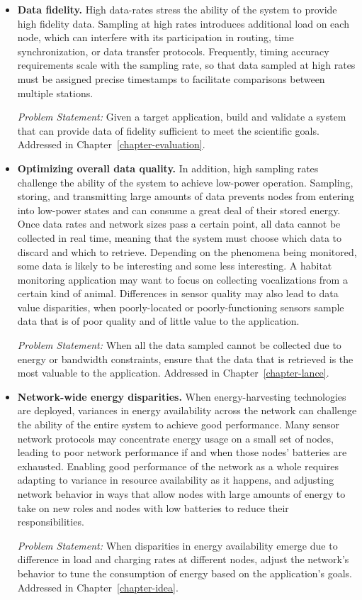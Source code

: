 \begin{itemize}

\item \textbf{Data fidelity.} High data-rates stress the ability of the
system to provide high fidelity data. Sampling at high rates introduces
additional load on each node, which can interfere with its participation in
routing, time synchronization, or data transfer protocols. Frequently, timing
accuracy requirements scale with the sampling rate, so that data sampled at
high rates must be assigned precise timestamps to facilitate comparisons
between multiple stations.

\textit{Problem Statement:} Given a target application, build and validate a
system that can provide data of fidelity sufficient to meet the scientific
goals. Addressed in Chapter~\ref{chapter-evaluation}.

\item \textbf{Optimizing overall data quality.} In addition, high sampling
rates challenge the ability of the system to achieve low-power operation.
Sampling, storing, and transmitting large amounts of data prevents nodes from
entering into low-power states and can consume a great deal of their stored
energy. Once data rates and network sizes pass a certain point, all data
cannot be collected in real time, meaning that the system must choose which
data to discard and which to retrieve. Depending on the phenomena being
monitored, some data is likely to be interesting and some less interesting. A
habitat monitoring application may want to focus on collecting vocalizations
from a certain kind of animal. Differences in sensor quality may also lead to
data value disparities, when poorly-located or poorly-functioning sensors
sample data that is of poor quality and of little value to the application.

\textit{Problem Statement:} When all the data sampled cannot be collected due
to energy or bandwidth constraints, ensure that the data that is retrieved is
the most valuable to the application. Addressed in
Chapter~\ref{chapter-lance}.

\item \textbf{Network-wide energy disparities.} When energy-harvesting
technologies are deployed, variances in energy availability across the
network can challenge the ability of the entire system to achieve good
performance. Many sensor network protocols may concentrate energy usage on a
small set of nodes, leading to poor network performance if and when those
nodes' batteries are exhausted. Enabling good performance of the network as a
whole requires adapting to variance in resource availability as it happens,
and adjusting network behavior in ways that allow nodes with large amounts of
energy to take on new roles and nodes with low batteries to reduce their
responsibilities.

\textit{Problem Statement:} When disparities in energy availability emerge
due to difference in load and charging rates at different nodes, adjust the
network's behavior to tune the consumption of energy based on the
application's goals. Addressed in Chapter~\ref{chapter-idea}.

\end{itemize}

